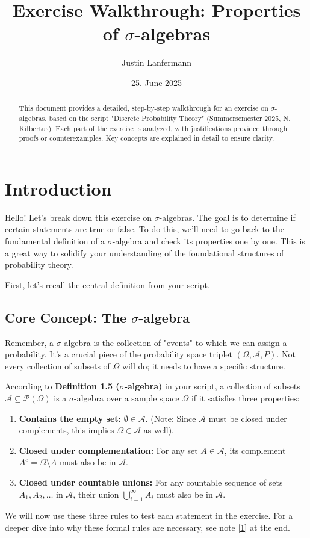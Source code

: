 \documentclass[11pt,a4paper]{article}
\title{Exercise Walkthrough: Properties of $\sigma$-algebras}
\author{Justin Lanfermann}
\date{25. June 2025}
\begin{document}
\maketitle

\begin{abstract}
    This document provides a detailed, step-by-step walkthrough for an exercise on $\sigma$-algebras, based on the script "Discrete Probability Theory" (Summersemester 2025, N. Kilbertus). Each part of the exercise is analyzed, with justifications provided through proofs or counterexamples. Key concepts are explained in detail to ensure clarity.
\end{abstract}

\section{Introduction}

Hello! Let's break down this exercise on $\sigma$-algebras. The goal is to determine if certain statements are true or false. To do this, we'll need to go back to the fundamental definition of a $\sigma$-algebra and check its properties one by one. This is a great way to solidify your understanding of the foundational structures of probability theory.

First, let's recall the central definition from your script.

\subsection{Core Concept: The \texorpdfstring{$\sigma$}{sigma}-algebra}

Remember, a $\sigma$-algebra is the collection of "events" to which we can assign a probability. It's a crucial piece of the probability space triplet $(\Omega, \mathcal{A}, P)$. Not every collection of subsets of $\Omega$ will do; it needs to have a specific structure.

According to \textbf{Definition 1.5 ($\sigma$-algebra)} in your script, a collection of subsets $\mathcal{A} \subseteq \mathcal{P}(\Omega)$ is a $\sigma$-algebra over a sample space $\Omega$ if it satisfies three properties:
\begin{enumerate}
    \item \textbf{Contains the empty set:} $\emptyset \in \mathcal{A}$. (Note: Since $\mathcal{A}$ must be closed under complements, this implies $\Omega \in \mathcal{A}$ as well).
    \item \textbf{Closed under complementation:} For any set $A \in \mathcal{A}$, its complement $A^c = \Omega \setminus A$ must also be in $\mathcal{A}$.
    \item \textbf{Closed under countable unions:} For any countable sequence of sets $A_1, A_2, \ldots$ in $\mathcal{A}$, their union $\bigcup_{i=1}^{\infty} A_i$ must also be in $\mathcal{A}$.
\end{enumerate}
We will now use these three rules to test each statement in the exercise. For a deeper dive into why these formal rules are necessary, see note \hyperlink{note1}{[1]} at the end.
\end{document}
